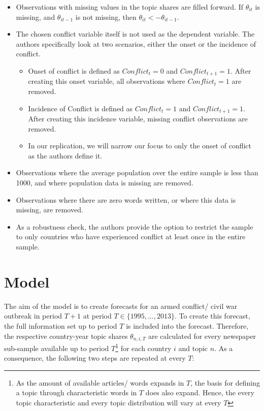 \begin{itemize}
    \item Observations with missing values in the topic shares are filled forward. If $\theta_{it}$ is missing, and $\theta_{it - 1}$ is not missing, then $\theta_{it} <- \theta_{it - 1}.$
    \item The chosen conflict variable itself is not used as the dependent variable. The authors specifically look at two scenarios, either the onset or the incidence of conflict.
        \begin{itemize}
            \item Onset of conflict is defined as $Conflict_{t} = 0$ and $Conflict_{t + 1} = 1$. After creating this onset variable, all observations where $Conflict_{t} = 1$ are removed.
            \item Incidence of Conflict is defined as $Conflict_{t} = 1$ and $Conflict_{t + 1} = 1$. After creating this incidence variable, missing conflict observations are removed.
            \item In our replication, we will narrow our focus to only the onset of conflict as the authors define it.
        \end{itemize}
    \item Observations where the average population over the entire sample is less than 1000, and where population data is missing are removed.
    \item Observations where there are zero words written, or where this data is missing, are removed.
    \item As a robustness check, the authors provide the option to restrict the sample to only countries who have experienced conflict at least once in the entire sample.
\end{itemize}

\section{Model}
The aim of the model is to create forecasts for an armed conflict/ civil war outbreak in period $T+1$ at period $T \in \{1995,..., 2013\}$.
To create this forecast, the full information set up to period $T$ is included into the forecast.
Therefore, the respective country-year topic shares $\theta_{n,i,T}$ are calculated for every newspaper sub-sample available up to period $T$\footnote{As the amount of available articles/ words expands in $T$, the basis for defining a topic through characteristic words in $T$ does also expand. Hence, the every topic characteristic and every topic distribution will vary at every $T$} for each country $i$ and topic $n$.
As a consequence, the following two steps are repeated at every $T$:

